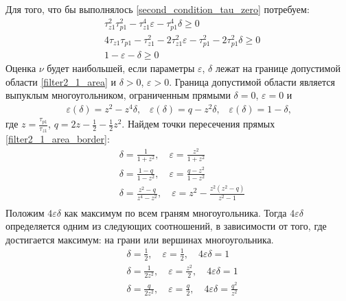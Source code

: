 \documentclass[a4paper,14pt]{article} %
\theoremstyle{cited}
\begin{document}
Для того, что бы выполнялось \eqref{second_condition_tau_zero} потребуем: 
 \begin{equation}\label{filter2_1_area}
 \begin{aligned}
&\tau_{z1}^2\tau_{p1}^2 - \tau_{z1}^4\varepsilon - \tau_{p1}^4\delta \geqslant 0\\
&4\tau_{z1}\tau_{p1} - \tau_{z1}^2 - 2\tau_{z1}^2\varepsilon - \tau_{p1}^2 - 2\tau_{p1}^2\delta \geqslant 0\\
&1-\varepsilon - \delta \geqslant 0
 \end{aligned}
\end{equation}
Оценка $\nu$ будет наибольшей, если параметры $\varepsilon$, $\delta$ лежат на границе допустимой области \eqref{filter2_1_area} и $\delta > 0$, $\varepsilon > 0$. Граница допустимой области является  выпуклым многоугольником, ограниченным прямыми $\delta = 0$, $\varepsilon = 0$ и
 \begin{equation}\label{filter2_1_area_border}
\begin{aligned}
\varepsilon(\delta)=z^2 - z^4\delta \text{,} \quad \varepsilon(\delta)=q - z^2\delta \text{,}
\quad \varepsilon(\delta)=1 - \delta \text{,}
\end{aligned}
\end{equation}
где $z = \frac{\tau_{p1}}{\tau_{z1}}$, $q = 2z - \frac{1}{2} - \frac{1}{2}z^2$. Найдем точки пересечения прямых \eqref{filter2_1_area_border}:
  \begin{equation}
 \begin{aligned}
&\delta = \frac{1}{1+z^2}, \quad \varepsilon = \frac{z^2}{1+z^2}\\
&\delta = \frac{1-q}{1-z^2}, \quad  \varepsilon = \frac{q-z^2}{1-z^2}\\
&\delta = \frac{z^2-q}{z^4-z^2}, \quad  \varepsilon = z^2 - \frac{z^2(z^2-q)}{z^2-1}\\
 \end{aligned}
\end{equation}
Положим $4\varepsilon\delta$ как максимум по всем граням многоугольника. Тогда $4\varepsilon\delta$ определяется одним из следующих соотношений, в зависимости от того, где достигается максимум: на грани или вершинах многоугольника.
  \begin{equation}
 \begin{aligned}
&\delta = \frac{1}{2}, \quad \varepsilon = \frac{1}{2}, \quad 4\varepsilon\delta = 1\\
&\delta = \frac{1}{2z^2}, \quad \varepsilon = \frac{z^2}{2}, \quad 4\varepsilon\delta = 1\\
&\delta = \frac{q}{2z^2}, \quad \varepsilon = \frac{q}{2}, \quad 4\varepsilon\delta = \frac{q^2}{z^2}\\
 \end{aligned}
\end{equation}
\end{document}
